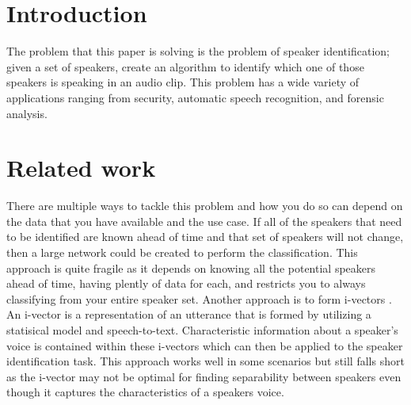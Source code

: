 \documentclass{article}
\begin{document}
\section{Introduction}
The problem that this paper is solving is the problem of speaker identification; given a set of speakers, create an
algorithm to identify which one of those speakers is speaking in an audio clip. This problem has a wide variety of 
applications ranging from security, automatic speech recognition, and forensic analysis. 


\section{Related work}
There are multiple ways to tackle this problem and how you do so can depend on the data that you have available and 
the use case. If all of the speakers that need to be identified are known ahead of time and that set of speakers will 
not change, then a large network could be created to perform the classification. This approach is quite fragile as it 
depends on knowing all the potential speakers ahead of time, having plently of data for each, and restricts you to 
always classifying from your entire speaker set. Another approach is to form i-vectors \cite{ivectors}. An i-vector
is a representation of an utterance that is formed by utilizing a statisical model and speech-to-text. Characteristic 
information about a speaker's voice is contained within these i-vectors which can then be applied to the speaker 
identification task. This approach works well in some scenarios but still falls short as the i-vector may not be optimal
for finding separability between speakers even though it captures the characteristics of a speakers voice.
\end{document}
